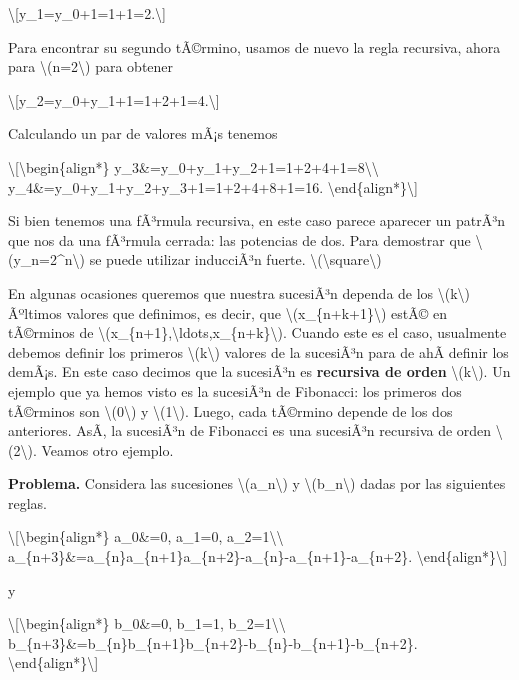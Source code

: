 \textbackslash{[}y\_1=y\_0+1=1+1=2.\textbackslash{]}

Para encontrar su segundo tÃ©rmino, usamos de nuevo la regla recursiva,
ahora para {\textbackslash(n=2\textbackslash)} para obtener

\textbackslash{[}y\_2=y\_0+y\_1+1=1+2+1=4.\textbackslash{]}

Calculando un par de valores mÃ¡s tenemos

\textbackslash{[}\textbackslash begin\{align*\}
y\_3\&=y\_0+y\_1+y\_2+1=1+2+4+1=8\textbackslash\textbackslash{}
y\_4\&=y\_0+y\_1+y\_2+y\_3+1=1+2+4+8+1=16.
\textbackslash end\{align*\}\textbackslash{]}

Si bien tenemos una fÃ³rmula recursiva, en este caso parece aparecer un
patrÃ³n que nos da una fÃ³rmula cerrada: las potencias de dos. Para
demostrar que {\textbackslash(y\_n=2\^{}n\textbackslash)} se puede
utilizar inducciÃ³n fuerte.
{{\textbackslash(\textbackslash square\textbackslash)}}

En algunas ocasiones queremos que nuestra sucesiÃ³n dependa de los
{\textbackslash(k\textbackslash)} Ãºltimos valores que definimos, es
decir, que {\textbackslash(x\_\{n+k+1\}\textbackslash)} estÃ© en
tÃ©rminos de
{\textbackslash(x\_\{n+1\},\textbackslash ldots,x\_\{n+k\}\textbackslash)}.
Cuando este es el caso, usualmente debemos definir los primeros
{\textbackslash(k\textbackslash)} valores de la sucesiÃ³n para de ahÃ­
definir los demÃ¡s. En este caso decimos que la sucesiÃ³n es
\textbf{recursiva de orden} {\textbackslash(k\textbackslash)}. Un
ejemplo que ya hemos visto es la sucesiÃ³n de Fibonacci: los primeros
dos tÃ©rminos son {\textbackslash(0\textbackslash)} y
{\textbackslash(1\textbackslash)}. Luego, cada tÃ©rmino depende de los
dos anteriores. AsÃ­, la sucesiÃ³n de Fibonacci es una sucesiÃ³n
recursiva de orden {\textbackslash(2\textbackslash)}. Veamos otro
ejemplo.

\textbf{Problema.} Considera las sucesiones
{\textbackslash(a\_n\textbackslash)} y
{\textbackslash(b\_n\textbackslash)} dadas por las siguientes reglas.

\textbackslash{[}\textbackslash begin\{align*\} a\_0\&=0, a\_1=0,
a\_2=1\textbackslash\textbackslash{}
a\_\{n+3\}\&=a\_\{n\}a\_\{n+1\}a\_\{n+2\}-a\_\{n\}-a\_\{n+1\}-a\_\{n+2\}.
\textbackslash end\{align*\}\textbackslash{]}

y

\textbackslash{[}\textbackslash begin\{align*\} b\_0\&=0, b\_1=1,
b\_2=1\textbackslash\textbackslash{}
b\_\{n+3\}\&=b\_\{n\}b\_\{n+1\}b\_\{n+2\}-b\_\{n\}-b\_\{n+1\}-b\_\{n+2\}.
\textbackslash end\{align*\}\textbackslash{]}

